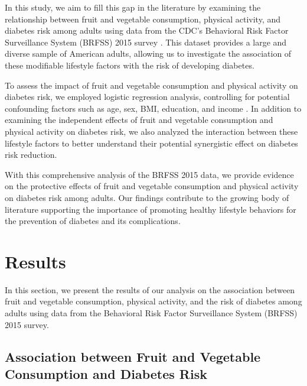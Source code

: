 \documentclass[11pt]{article}
\begin{document}
In this study, we aim to fill this gap in the literature by examining the relationship between fruit and vegetable consumption, physical activity, and diabetes risk among adults using data from the CDC's Behavioral Risk Factor Surveillance System (BRFSS) 2015 survey \cite{Flores-Hernández2015QualityOD,Iachan2016NationalWO}. This dataset provides a large and diverse sample of American adults, allowing us to investigate the association of these modifiable lifestyle factors with the risk of developing diabetes.

To assess the impact of fruit and vegetable consumption and physical activity on diabetes risk, we employed logistic regression analysis, controlling for potential confounding factors such as age, sex, BMI, education, and income \cite{Gomes-Neto2019FruitAV}. In addition to examining the independent effects of fruit and vegetable consumption and physical activity on diabetes risk, we also analyzed the interaction between these lifestyle factors to better understand their potential synergistic effect on diabetes risk reduction.

With this comprehensive analysis of the BRFSS 2015 data, we provide evidence on the protective effects of fruit and vegetable consumption and physical activity on diabetes risk among adults. Our findings contribute to the growing body of literature supporting the importance of promoting healthy lifestyle behaviors for the prevention of diabetes and its complications.

\section*{Results}

In this section, we present the results of our analysis on the association between fruit and vegetable consumption, physical activity, and the risk of diabetes among adults using data from the Behavioral Risk Factor Surveillance System (BRFSS) 2015 survey.

\subsection*{Association between Fruit and Vegetable Consumption and Diabetes Risk}
\end{document}
